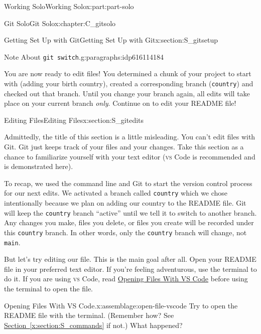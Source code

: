 \documentclass[oneside,10pt,]{book}
\newcommand{\xreffont}{\relax}
\newcommand{\mono}[1]{\texttt{#1}}
\newcommand{\initialism}[1]{\textsc{\MakeLowercase{#1}}}
\DeclareRobustCommand{\initialismintitle}[1]{\texorpdfstring{#1}{#1}}
\begin{document}
\begin{partptx}{Working Solo}{}{Working Solo}{}{}{x:part:part-solo}
\begin{chapterptx}{Git Solo}{}{Git Solo}{}{}{x:chapter:C_gitsolo}
\begin{sectionptx}{Getting Set Up with Git}{}{Getting Set Up with Git}{}{}{x:section:S_gitsetup}
\begin{paragraphs}{Note About \mono{git switch}.}{g:paragraphs:idp616114184}
\end{paragraphs}%
\begin{conclusion}{}%
You are now ready to edit files! You determined a chunk of your project to start with (adding your birth country), created a corresponding branch (\mono{country}) and checked out that branch. Until you change your branch again, all edits will take place on your current branch \emph{only}. Continue on to edit your README file!%
\end{conclusion}%
\end{sectionptx}
%
%
\typeout{************************************************}
\typeout{************************************************}
%
\begin{sectionptx}{Editing Files}{}{Editing Files}{}{}{x:section:S_gitedits}
%
%
%
\begin{introduction}{}%
Admittedly, the title of this section is a little misleading. You can't edit files with Git. Git just keeps track of your files and your changes. Take this section as a chance to familiarize yourself with your text editor (\initialism{VS} Code is recommended and is demonstrated here).%
\end{introduction}%
To recap, we used the command line and Git to start the version control process for our next edits. We activated a branch called \mono{country} which we chose intentionally because we plan on adding our country to the README file. Git will keep the \mono{country} branch ``active'' until we tell it to switch to another branch. Any changes you make, files you delete, or files you create will be recorded under this \mono{country} branch. In other words, only the \mono{country} branch will change, not \mono{main}.%
\par
But let's try editing our file. This is the main goal after all. Open your README file in your preferred text editor. If you're feeling adventurous, use the terminal to do it. If you are using \initialism{VS} Code, read \hyperref[x:assemblage:open-file-vscode]{Opening Files With \initialismintitle{VS} Code} before using the terminal to open the file.%
\begin{assemblage}{Opening Files With \initialismintitle{VS} Code.}{x:assemblage:open-file-vscode}%
Try to open the README file with the terminal. (Remember how? See \hyperref[x:section:S_commands]{Section~{\xreffont\ref{x:section:S_commands}}} if not.) What happened?%
\par

\end{assemblage}
\end{sectionptx}
\end{chapterptx}
\end{partptx}
\end{document}
